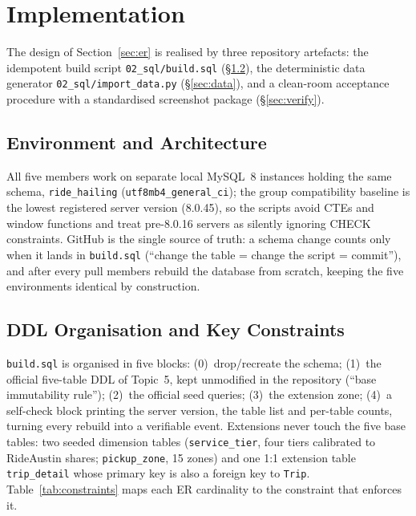 \section{Implementation}
\label{sec:impl}

The design of Section~\ref{sec:er} is realised by three repository artefacts: the idempotent build
script \texttt{02\_sql/build.sql} (\S\ref{sec:ddl}), the deterministic data generator
\texttt{02\_sql/import\_data.py} (\S\ref{sec:data}), and a clean-room acceptance procedure with a
standardised screenshot package (\S\ref{sec:verify}).

\subsection{Environment and Architecture}
\label{sec:env}
All five members work on separate local MySQL~8 instances holding the same schema, \texttt{ride\_hailing}
(\texttt{utf8mb4\_general\_ci}); the group compatibility baseline is the lowest registered server
version (8.0.45), so the scripts avoid CTEs and window functions and treat pre-8.0.16 servers as
silently ignoring CHECK constraints. GitHub is the single source of truth: a schema change counts
only when it lands in \texttt{build.sql} (``change the table = change the script = commit''), and
after every pull members rebuild the database from scratch, keeping the five environments identical
by construction.

\subsection{DDL Organisation and Key Constraints}
\label{sec:ddl}
\texttt{build.sql} is organised in five blocks: (0)~drop/recreate the schema; (1)~the official
five-table DDL of Topic~5, kept unmodified in the repository (``base immutability rule'');
(2)~the official seed queries; (3)~the extension zone; (4)~a self-check block printing the server
version, the table list and per-table counts, turning every rebuild into a verifiable event.
Extensions never touch the five base tables: two seeded dimension tables (\texttt{service\_tier},
four tiers calibrated to RideAustin shares; \texttt{pickup\_zone}, 15 zones) and one 1:1 extension
table \texttt{trip\_detail} whose primary key is also a foreign key to \texttt{Trip}.
Table~\ref{tab:constraints} maps each ER cardinality to the constraint that enforces it.

